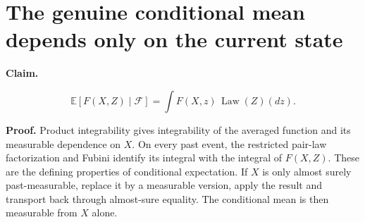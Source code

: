 \documentclass[11pt,a4paper]{article}
\begin{document}
\section{\texorpdfstring{The genuine conditional mean depends only on the current state}{The genuine conditional mean depends only on the current state}}


\textbf{Claim.}

\[\mathbb E[F(X,Z)\mid\mathcal F]=\int F(X,z)\,\operatorname{Law}(Z)(dz).\]

\textbf{Proof.} Product integrability gives integrability of the averaged function and its measurable dependence on \(X\). On every past event, the restricted pair-law factorization and Fubini identify its integral with the integral of \(F(X,Z)\). These are the defining properties of conditional expectation. If \(X\) is only almost surely past-measurable, replace it by a measurable version, apply the result and transport back through almost-sure equality. The conditional mean is then measurable from \(X\) alone.
\end{document}
